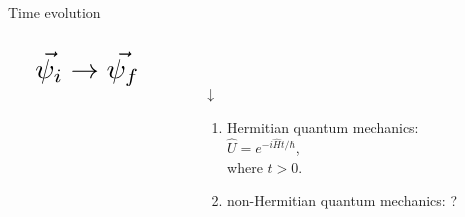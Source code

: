 \documentclass[10pt]{beamer}
\newcommand*{\Scale}[2][4]{\scalebox{#1}{\ensuremath{#2}}}%
\begin{document}
\begin{frame}{Time evolution}
\vspace{-1cm}
\hspace{-2em}
\vspace{2cm}
\begin{columns}[T]
    \begin{column}{0.3\textwidth}
    \vspace{-2cm}
    \begin{align*}
    &\Scale[2]{\vec{\psi_{i}} \rightarrow{} \vec{\psi_{f}}}
    \end{align*}
    \pause
    \hspace{6em}
    \Scale[2.2]{\hookrightarrow}
    \end{column}
    
    \begin{column}{0.8\textwidth}
    \vspace{-1.3cm}
    \Scale[3]{\vec{\psi_{f}} = \hat{U} \vec{\psi_{i}}}\\
    \pause
    \hspace{6.8em}
    \begin{huge}
    {$\downarrow$}\\
    \end{huge}
    \begin{enumerate}
    \item \textcolor{myNewColorA}{Hermitian} quantum mechanics:\\
    \hspace{5em}
    $\hat{U} = e^{-i\hat{H}t / \hbar}$,\\
    \hspace{5em}
    where $t > 0$.
    \vspace{0.3cm}
    \pause
    \item \textcolor{myNewColorB}{non-Hermitian} quantum mechanics: \textcolor{myNewColorB}{\large{?}}
    \end{enumerate}
    \pause
    \vspace{0.7cm}
    \end{column}
    \end{columns}
\end{frame}
\end{document}
